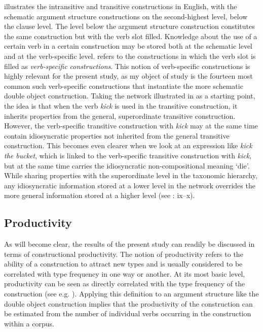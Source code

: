 \documentclass[output=paper]{langscibook}
\begin{document}
 illustrates the intransitive and transitive constructions in English, with the schematic argument structure constructions on the second-highest level, below the clause level. The level below the argument structure construction constitutes the same construction but with the verb slot filled. Knowledge about the use of a certain verb in a certain construction may be stored both at the schematic level and at the verb-specific level. \citet[25]{Croft2001} refers to the constructions in which the verb slot is filled as \textit{verb-specific constructions}. This notion of verb-specific constructions is highly relevant for the present study, as my object of study is the fourteen most common such verb-specific constructions that instantiate the more schematic double object construction. Taking the network illustrated in  as a starting point, the idea is that when the verb \textit{kick} is used in the transitive construction, it inherits properties from the general, superordinate transitive construction. However, the verb-specific transitive construction with \textit{kick} may at the same time contain idiosyncratic properties not inherited from the general transitive construction. This becomes even clearer when we look at an expression like \textit{kick the bucket}, which is linked to the verb-specific transitive construction with \textit{kick}, but at the same time carries the idiosyncratic non-compositional meaning ‘die’. While sharing properties with the superordinate level in the taxonomic hierarchy, any idiosyncratic information stored at a lower level in the network overrides the more general information stored at a higher level (see \citealt{KemmerBarlow2000}: ix–x).


\subsection{Productivity}\label{sec:valdeson:3.2}


As will become clear, the results of the present study can readily be discussed in terms of constructional productivity. The notion of productivity refers to the ability of a construction to attract new types and is usually considered to be correlated with type frequency in one way or another. At its most basic level, productivity can be seen as directly correlated with the type frequency of the construction (see e.g. \citealt{Bybee2010}). Applying this definition to an argument structure like the double object construction implies that the productivity of the construction can be estimated from the number of individual verbs occurring in the construction within a corpus.
\end{document}
